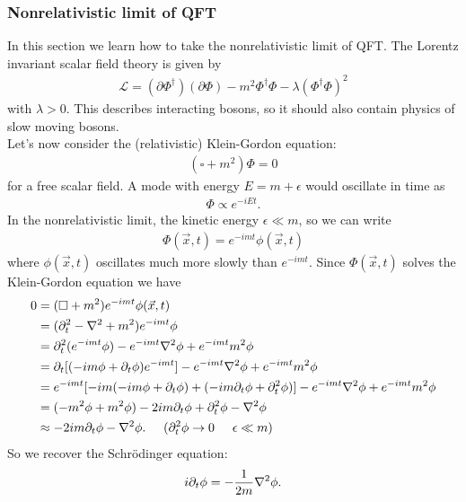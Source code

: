 \documentclass{book}
\theoremstyle{definition}
\newcommand{\p}{\partial}
\newcommand{\lag}{\mathcal{L}}
\newcommand{\nn}{\nonumber}
\newcommand{\f}[2]{\frac{#1}{#2}}
\begin{document}
\subsubsection{Nonrelativistic limit of QFT}

In this section we learn how to take the nonrelativistic limit of QFT. The Lorentz invariant scalar field theory is given by
\begin{align}
\lag = (\p \Phi^\dagger) (\p \Phi) - m^2 \Phi^\dagger\Phi - \lambda(\Phi^\dagger\Phi)^2
\end{align}
with $\lambda > 0$. This describes interacting bosons, so it should also contain physics of slow moving bosons. \\


Let's now consider the (relativistic) Klein-Gordon equation:
\begin{align}
(\square + m^2)\Phi = 0
\end{align}
for a free scalar field. A mode with energy $E = m + \epsilon$ would oscillate in time as
\begin{align}
\Phi \propto e^{-iEt}.
\end{align}
In the nonrelativistic limit, the kinetic energy $\epsilon \ll m$, so we can write
\begin{align}
\Phi(\vec{x},t) = e^{-imt}\phi(\vec{x},t)
\end{align} 
where $\phi(\vec{x},t)$ oscillates much more slowly than $e^{-imt}$. Since $\Phi(\vec{x},t)$ solves the Klein-Gordon equation we have
\begin{align}
0 &= (\square + m^2)e^{-imt}\phi(\vec{x},t) \nn\\
&=  (\p_t^2 - \laplacian + m^2)e^{-imt}\phi \nn\\
&= \p_t^2(e^{-imt}\phi) - e^{-imt}\laplacian\phi + e^{-imt}m^2\phi \nn\\
&= \p_t[(-im\phi + \p_t\phi)e^{-imt}] - e^{-imt}\laplacian\phi + e^{-imt}m^2\phi \nn\\
&= e^{-imt}[-im(-im\phi + \p_t\phi) + (-im\p_t \phi + \p_t^2\phi)] - e^{-imt}\laplacian\phi + e^{-imt}m^2\phi \nn\\
&= (-m^2\phi + m^2 \phi) -2im\p_t\phi + \p_t^2\phi -\laplacian \phi \nn\\
&\approx -2im\p_t\phi - \laplacian \phi. \hspace{0.5cm} (\p_t^2\phi \to 0 \hspace{0.5cm}\epsilon\ll m)
\end{align} 
So we recover the Schr\"{o}dinger equation:
\begin{align}
i\p_t \phi = -\f{1}{2m}\laplacian \phi.
\end{align}
\end{document}
